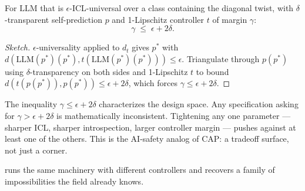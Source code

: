 \begin{theorem}
\label{thm:quant}
For $\mathrm{LLM}$ that is $\epsilon$-ICL-universal over a class containing the diagonal twist, with $\delta$-transparent self-prediction $p$ and 1-Lipschitz controller $t$ of margin $\gamma$:
\[
   \gamma \;\le\; \epsilon + 2\delta.
\]
\end{theorem}

\begin{proof}[Sketch]
$\epsilon$-universality applied to $d_t$ gives $p^*$ with $d(\mathrm{LLM}(p^*)(p^*), t(\mathrm{LLM}(p^*)(p^*))) \le \epsilon$. Triangulate through $p(p^*)$ using $\delta$-transparency on both sides and 1-Lipschitz $t$ to bound $d(t(p(p^*)), p(p^*)) \le \epsilon + 2\delta$, which forces $\gamma \le \epsilon + 2\delta$.
\end{proof}

\begin{remark}
\label{rem:achievable}
The inequality $\gamma \le \epsilon + 2\delta$ characterizes the design space. Any specification asking for $\gamma > \epsilon + 2\delta$ is mathematically inconsistent. Tightening any one parameter --- sharper ICL, sharper introspection, larger controller margin --- pushes against at least one of the others. This is the AI-safety analog of CAP: a tradeoff surface, not just a corner.
\end{remark}

\medskip
{} runs the same machinery with different controllers and recovers a family of impossibilities the field already knows.
